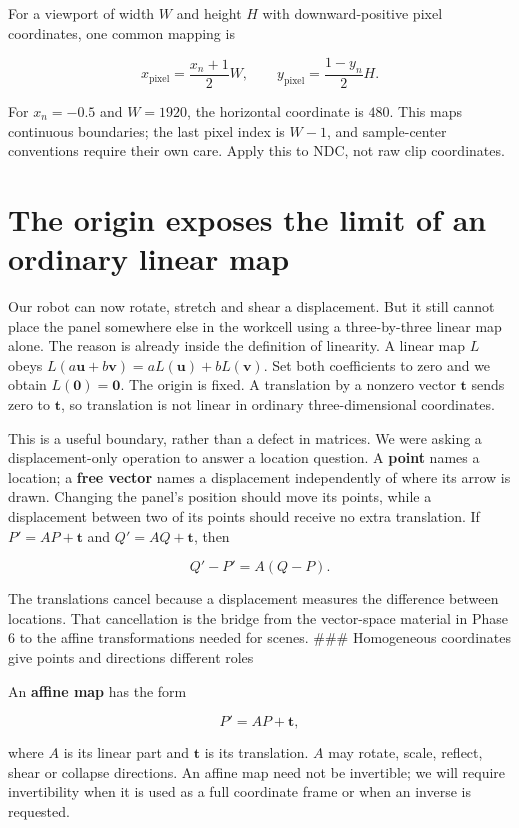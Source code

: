 For a viewport of width \(W\) and height \(H\) with downward-positive pixel coordinates, one common mapping is

\[
x_{\mathrm{pixel}}=\frac{x_n+1}{2}W,\qquad
y_{\mathrm{pixel}}=\frac{1-y_n}{2}H.
\]

For \(x_n=-0.5\) and \(W=1920\), the horizontal coordinate is \(480\). This maps continuous boundaries; the last pixel index is \(W-1\), and sample-center conventions require their own care. Apply this to NDC, not raw clip coordinates.

\section{The origin exposes the limit of an ordinary linear map}\label{01-foundations-i-ch018-the-origin-exposes-the-limit-of-an-ordinary-linear-map}

Our robot can now rotate, stretch and shear a displacement. But it still cannot place the panel somewhere else in the workcell using a three-by-three linear map alone. The reason is already inside the definition of linearity. A linear map \(L\) obeys \(L(a\mathbf u+b\mathbf v)=aL(\mathbf u)+bL(\mathbf v)\). Set both coefficients to zero and we obtain \(L(\mathbf0)=\mathbf0\). The origin is fixed. A translation by a nonzero vector \(\mathbf t\) sends zero to \(\mathbf t\), so translation is not linear in ordinary three-dimensional coordinates.

This is a useful boundary, rather than a defect in matrices. We were asking a displacement-only operation to answer a location question. A \textbf{point} names a location; a \textbf{free vector} names a displacement independently of where its arrow is drawn. Changing the panel's position should move its points, while a displacement between two of its points should receive no extra translation. If \(P'=AP+\mathbf t\) and \(Q'=AQ+\mathbf t\), then

\[
Q'-P'=A(Q-P).
\]

The translations cancel because a displacement measures the difference between locations. That cancellation is the bridge from the vector-space material in Phase 6 to the affine transformations needed for scenes. \#\#\# Homogeneous coordinates give points and directions different roles

An \textbf{affine map} has the form

\[
P'=AP+\mathbf t,
\]

where \(A\) is its linear part and \(\mathbf t\) is its translation. \(A\) may rotate, scale, reflect, shear or collapse directions. An affine map need not be invertible; we will require invertibility when it is used as a full coordinate frame or when an inverse is requested.

